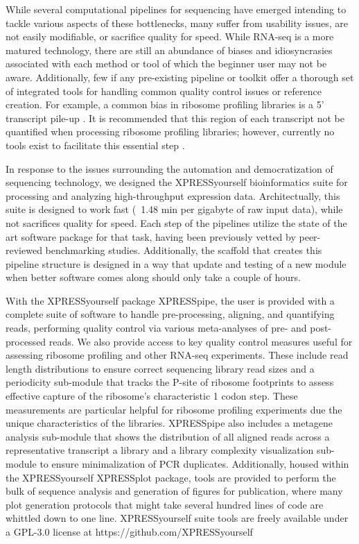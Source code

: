 \documentclass[11pt, a4paper, oneside]{article}
\begin{document}
While several computational pipelines for sequencing have emerged intending to tackle various aspects of these bottlenecks, many suffer from usability issues, are not easily modifiable, or sacrifice quality for speed. While RNA-seq is a more matured technology, there are still an abundance of biases and idiosyncrasies associated with each method or tool of which the beginner user may not be aware. Additionally, few if any pre-existing pipeline or toolkit offer a thorough set of integrated tools for handling common quality control issues or reference creation. For example, a common bias in ribosome profiling libraries is a 5' transcript pile-up \cite{gerashchenko_nar, artieri_gr, hussman_plosg}. It is recommended that this region of each transcript not be quantified when processing ribosome profiling libraries; however, currently no tools exist to facilitate this essential step \cite{ingolia_meth, weinberg_reports}.

In response to the issues surrounding the automation and democratization of sequencing technology, we designed the XPRESSyourself bioinformatics suite for processing and analyzing high-throughput expression data. Architectually, this suite is designed to work fast (~1.48 min per gigabyte of raw input data), while not sacrifices quality for speed. Each step of the pipelines utilize the state of the art software package for that task, having been previously vetted by peer-reviewed benchmarking studies. Additionally, the scaffold that creates this pipeline structure is designed in a way that update and testing of a new module when better software comes along should only take a couple of hours.

With the XPRESSyourself package XPRESSpipe, the user is provided with a complete suite of software to handle pre-processing, aligning, and quantifying reads, performing quality control via various meta-analyses of pre- and post-processed reads. We also provide access to key quality control measures useful for assessing ribosome profiling and other RNA-seq experiments. These include read length distributions to ensure correct sequencing library read sizes and a periodicity sub-module that tracks the P-site of ribosome footprints to assess effective capture of the ribosome's characteristic 1 codon step. These measurements are particular helpful for ribosome profiling experiments due the unique characteristics of the libraries. XPRESSpipe also includes a metagene analysis sub-module that shows the distribution of all aligned reads across a representative transcript a library and a library complexity visualization sub-module to ensure minimalization of PCR duplicates. Additionally, housed within the XPRESSyourself XPRESSplot package, tools are provided to perform the bulk of sequence analysis and generation of figures for publication, where many plot generation protocols that might take several hundred lines of code are whittled down to one line. XPRESSyourself suite tools are freely available under a GPL-3.0 license at https://github.com/XPRESSyourself
\end{document}

